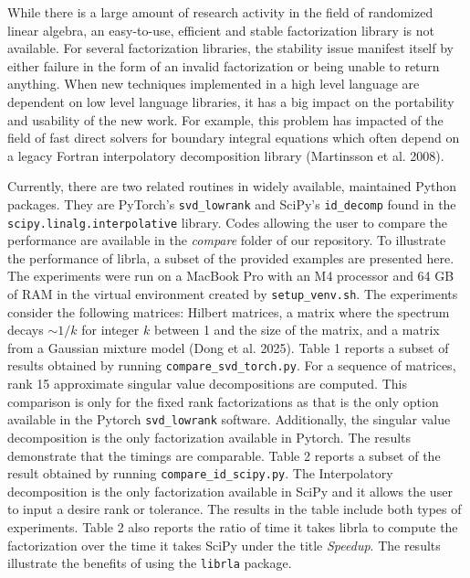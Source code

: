 \documentclass[
  12pt,
]{article}
\begin{document}
While there is a large amount of research activity in the field of
randomized linear algebra, an easy-to-use, efficient and stable
factorization library is not available. For several factorization
libraries, the stability issue manifest itself by either failure in the
form of an invalid factorization or being unable to return anything.
When new techniques implemented in a high level language are dependent
on low level language libraries, it has a big impact on the portability
and usability of the new work. For example, this problem has impacted of
the field of fast direct solvers for boundary integral equations which
often depend on a legacy Fortran interpolatory decomposition library
(Martinsson et al. 2008).

Currently, there are two related routines in widely available,
maintained Python packages. They are PyTorch's \texttt{svd\_lowrank} and
SciPy's \texttt{id\_decomp} found in the
\texttt{scipy.linalg.interpolative} library. Codes allowing the user to
compare the performance are available in the \emph{compare} folder of
our repository. To illustrate the performance of librla, a subset of the
provided examples are presented here. The experiments were run on a
MacBook Pro with an M4 processor and 64 GB of RAM in the virtual
environment created by \texttt{setup\_venv.sh}. The experiments consider
the following matrices: Hilbert matrices, a matrix where the spectrum
decays \(\sim1/k\) for integer \(k\) between 1 and the size of the
matrix, and a matrix from a Gaussian mixture model (Dong et al. 2025).
Table 1 reports a subset of results obtained by running
\texttt{compare\_svd\_torch.py}. For a sequence of matrices, rank 15
approximate singular value decompositions are computed. This comparison
is only for the fixed rank factorizations as that is the only option
available in the Pytorch \texttt{svd\_lowrank} software. Additionally,
the singular value decomposition is the only factorization available in
Pytorch. The results demonstrate that the timings are comparable. Table
2 reports a subset of the result obtained by running
\texttt{compare\_id\_scipy.py}. The Interpolatory decomposition is the
only factorization available in SciPy and it allows the user to input a
desire rank or tolerance. The results in the table include both types of
experiments. Table 2 also reports the ratio of time it takes librla to
compute the factorization over the time it takes SciPy under the title
\emph{Speedup}. The results illustrate the benefits of using the
\texttt{librla} package.
\end{document}
